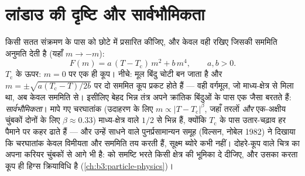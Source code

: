 \section{लांडाउ की दृष्टि और सार्वभौमिकता}

\begin{proposition}[लांडाउ सिद्धांत]\label{prop:b3:phase-transitions:landau}
किसी सतत संक्रमण के पास  को छोटे
 में प्रसारित कीजिए, और केवल वही रखिए जिसकी सममिति अनुमति
देती है (यहाँ $m \to -m$):
\[
F(m) = a\,(T - T_{\text{c}})\,m^2 + b\,m^4 , \qquad a, b > 0 .
\]
$T_{\text{c}}$ के ऊपर: $m = 0$ पर एक ही कूप। नीचे: मूल बिंदु
चोटी बन जाता है और $m = \pm
\sqrt{a(T_{\text{c}} - T)/2b}$ पर दो सममित कूप प्रकट होते हैं ---
वही वर्गमूल, जो माध्य-क्षेत्र से मिला था, अब केवल सममिति से।
इसीलिए बेहद भिन्न तंत्र अपने क्रांतिक बिंदुओं के पास एक जैसा बरतते
हैं: \emph{सार्वभौमिकता}। मापे गए चरघातांक (उदाहरण के लिए $m \propto |T -
T_{\text{c}}|^\beta$, जहाँ तरलों \emph{और} एक-अक्षीय चुंबकों दोनों
के लिए $\beta \approx 0.33$) माध्य-क्षेत्र वाले $1/2$ से भिन्न हैं,
क्योंकि $T_{\text{c}}$ के पास उतार-चढ़ाव हर पैमाने पर कहर ढाते हैं
--- और उन्हें साधने वाले पुनर्प्रसामान्यन समूह (विल्सन, नोबेल 1982)
ने दिखाया कि चरघातांक केवल विमीयता और सममिति तय करती हैं, सूक्ष्म
ब्योरे कभी नहीं। दोहरे-कूप वाले चित्र का अपना करियर चुंबकों से आगे भी
है:  को समष्टि भरते किसी क्षेत्र की भूमिका दे दीजिए, और
उसका  करता कूप ही हिग्स
क्रियाविधि है (\cref{ch:b3:particle-physics})।
\end{proposition}
\admitted

